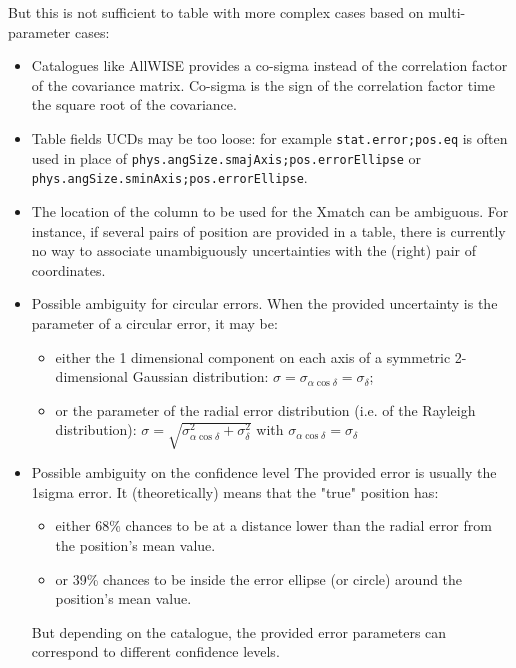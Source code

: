 But this is not sufficient to table with more complex cases based on multi-parameter cases:

\begin{itemize}
	\item Catalogues like AllWISE provides a co-sigma instead of the correlation factor of the covariance matrix.
	Co-sigma is the sign of the correlation factor time the square root of the covariance.
	\item Table fields UCDs  may be too loose: for example  \texttt{stat.error;pos.eq} is often used in place of \texttt{phys.angSize.smajAxis;pos.errorEllipse} or \texttt{phys.angSize.sminAxis;pos.errorEllipse}.
	\item The location  of the column to be used for the Xmatch can be ambiguous. For instance, if several pairs of position are provided in a table, there is currently
	no way to associate unambiguously uncertainties with the (right) pair of coordinates.
	\item  Possible ambiguity for circular errors. When the provided uncertainty is the parameter of a circular error, it may be:
	\begin{itemize}
		\item either the 1 dimensional component on each axis of a symmetric 2-dimensional Gaussian distribution: $\sigma=\sigma_{\alpha\cos\delta}=\sigma_\delta$;
		\item or the parameter of the radial error distribution (i.e. of the Rayleigh distribution): $\sigma=\sqrt{\sigma_{\alpha\cos\delta}^2 + \sigma_\delta^2}$
                 with $\sigma_{\alpha\cos\delta} = \sigma_\delta$
         \end{itemize}

	\item   Possible ambiguity on the confidence level
	The provided error is usually the 1sigma error.
	It (theoretically) means that the "true" position has:
	\begin{itemize}
		\item either 68\% chances to be at a distance lower than the radial error from the position's mean value.
		\item or 39\% chances to be inside the error ellipse (or circle) around the position's mean value.
	\end{itemize}
	But depending on the catalogue, the provided error parameters can correspond to different confidence levels.

\end{itemize}

